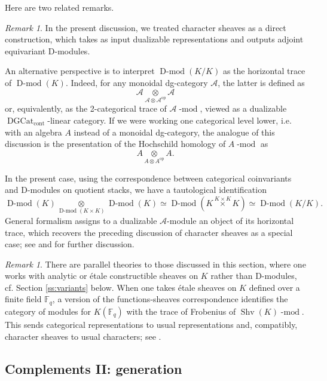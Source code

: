 \documentclass[10pt]{amsart}
\newcommand{\on}{\operatorname}
\renewcommand{\mod}{\on{-mod}}
\newcommand{\Dmod}{\on{D-mod}}
\newcommand{\Fq}{\mathbb{F}_q}
\theoremstyle{remark}
\newtheorem{re}[subsubsection]{Remark}
\newcommand{\sA}{\mathscr{A}}
\numberwithin{equation}{section}
\newcommand{\msf}{\operatorname}
\renewcommand{\mod}{\operatorname{-mod}}
\newcommand{\DGCat}{\msf{DGCat}_{\on{cont}}}
\begin{document}
Here are two related remarks. 

\begin{re}In the present discussion, we treated character sheaves as a 
direct construction, which takes as input dualizable representations and 
outputs adjoint equivariant D-modules. 

An alternative perspective is to interpret $\Dmod(K/K)$ as the horizontal trace 
of $\Dmod(K)$. Indeed, for any monoidal dg-category $\sA$, the latter is 
defined as $$\sA \underset{ \sA \otimes \sA^{\on{op}}}\otimes \sA$$or, 
equivalently, as 
the 2-categorical trace of $\sA\mod$, viewed as a dualizable $\DGCat$-linear 
category. If we were working one categorical level lower, i.e. with an algebra $A$ instead of a monoidal dg-category, the analogue of this discussion is the presentation of the Hochschild homology of $A\mod$ as
%
\[
  A \underset{A \otimes A^{\on{op}}} \otimes A. 
\]
%

In the present case, using the correspondence between categorical coinvariants 
and D-modules on quotient stacks, we 
have a tautological identification 
%
\[
   \Dmod(K) \underset{ \Dmod(K \times K)} \otimes \Dmod(K) \simeq \Dmod(K 
   \overset{K \times K} \times K) \simeq \Dmod(K / K).
\]
%
General formalism assigns to a dualizable $\sA$-module an 
object of its horizontal trace, which recovers the preceding discussion of 
character sheaves as a 
special case; see \cite{gkrvtoyshtuka} and \cite{bznadlerchartheory} for further discussion.
\end{re}



\begin{re}There are parallel theories to those discussed in this section, where 
one works with analytic or \'etale constructible sheaves on $K$ rather than 
D-modules, cf. Section \ref{ss:variants} below. When one takes \'etale sheaves on $K$ defined over a finite field 
$\Fq$, a version of the functions-sheaves correspondence 
identifies the category of modules for $K(\Fq)$ with the trace of Frobenius of 
$\on{Shv}(K)\mod$. This sends categorical representations to usual 
representations and, compatibly, character sheaves to usual 
characters; see \cite{Gaitsgoryinventshtukas}. 
\end{re}


\subsection{Complements II: generation}
\end{document}
